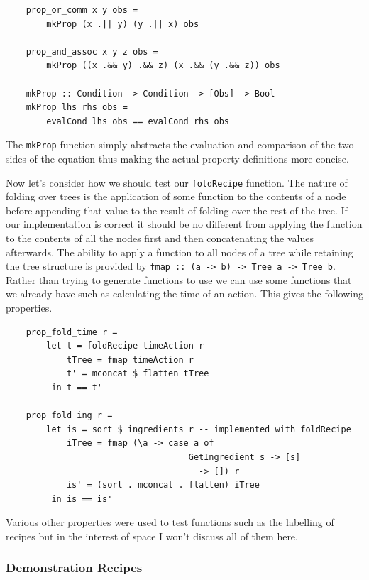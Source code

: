 \documentclass[11pt]{article}
\begin{document}
\begin{lstlisting}
    prop_or_comm x y obs =
        mkProp (x .|| y) (y .|| x) obs

    prop_and_assoc x y z obs =
        mkProp ((x .&& y) .&& z) (x .&& (y .&& z)) obs

    mkProp :: Condition -> Condition -> [Obs] -> Bool
    mkProp lhs rhs obs =
        evalCond lhs obs == evalCond rhs obs
\end{lstlisting}

The \texttt{mkProp} function simply abstracts the evaluation and comparison of the two
sides of the equation thus making the actual property definitions more concise.

\medbreak

Now let's consider how we should test our \texttt{foldRecipe} function. The nature
of folding over trees is the application of some function to the contents of a node
before appending that value to the result of folding over the rest of the tree.
If our implementation is correct it should be no different from applying the function
to the contents of all the nodes first and then concatenating the values afterwards.
The ability to apply a function to all nodes of a tree while retaining the tree structure
is provided by \texttt{fmap :: (a -> b) -> Tree a -> Tree b}. Rather than trying to
generate functions to use we can use some functions that we already have such as
calculating the time of an action. This gives the following properties.

\begin{lstlisting}
    prop_fold_time r =
        let t = foldRecipe timeAction r
            tTree = fmap timeAction r
            t' = mconcat $ flatten tTree
         in t == t'

    prop_fold_ing r =
        let is = sort $ ingredients r -- implemented with foldRecipe
            iTree = fmap (\a -> case a of
                                    GetIngredient s -> [s]
                                    _ -> []) r
            is' = (sort . mconcat . flatten) iTree
         in is == is'
\end{lstlisting}

Various other properties were used to test functions such as the labelling of recipes
but in the interest of space I won't discuss all of them here.

\subsubsection{Demonstration Recipes}
\end{document}
